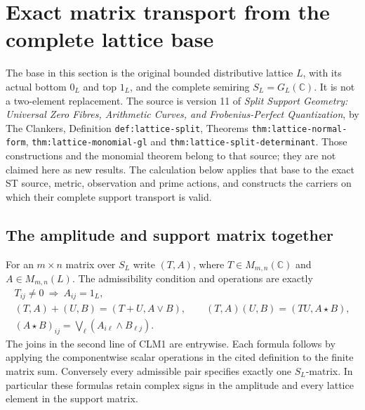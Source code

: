 \documentclass[11pt]{article}
\begin{document}
\section{Exact matrix transport from the complete lattice base}
\label{sec:complete-lattice-matrix-transport}

The base in this section is the original bounded distributive lattice
$L$, with its actual bottom $0_L$ and top $1_L$, and the complete
semiring $S_L=G_L(\mathbb C)$. It is not a two-element replacement.
The source is version 11 of \emph{Split Support Geometry: Universal
Zero Fibres, Arithmetic Curves, and Frobenius-Perfect Quantization},
by The Clankers, Definition \texttt{def:lattice-split}, Theorems
\texttt{thm:lattice-normal-form}, \texttt{thm:lattice-monomial-gl}
and \texttt{thm:lattice-split-determinant}. Those constructions and
the monomial theorem belong to that source; they are not claimed here
as new results. The calculation below applies that base to the exact
ST source, metric, observation and prime actions, and constructs the
carriers on which their complete support transport is valid.

\subsection{The amplitude and support matrix together}

For an $m\times n$ matrix over $S_L$ write $(T,A)$, where
$T\in M_{m,n}(\mathbb C)$ and $A\in M_{m,n}(L)$. The admissibility
condition and operations are exactly
\begin{equation}\tag{CLM1}
\begin{gathered}
T_{ij}\ne0\ \Longrightarrow\ A_{ij}=1_L,\\
(T,A)+(U,B)=(T+U,A\vee B),\qquad
(T,A)(U,B)=(TU,A\star B),\\
(A\star B)_{ij}=\bigvee_\ell(A_{i\ell}\wedge B_{\ell j}).
\end{gathered}
\end{equation}
The joins in the second line of CLM1 are entrywise. Each formula follows
by applying the componentwise scalar operations in the cited definition
to the finite matrix sum. Conversely every admissible pair specifies
exactly one $S_L$-matrix. In particular these formulas retain complex
signs in the amplitude and every lattice element in the support matrix.
\end{document}
